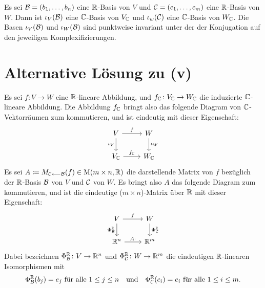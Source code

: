 \documentclass[a4paper,10pt,numbers=noenddot]{scrartcl}
\begin{document}
Es sei $\mathcal{B} = (b_1, \dotsc, b_n)$ eine $\mathbb{R}$-Basis von $V$ und $\mathcal{C} = (c_1, \dotsc, c_m)$ eine $\mathbb{R}$-Basis von $W$.
Dann ist $\iota_V(\mathcal{B})$ eine $\mathbb{C}$-Basis von $V_{\mathbb{C}}$ und $\iota_w(\mathcal{C})$ eine $\mathbb{C}$-Basis von $W_{\mathbb{C}}$.
Die Basen $\iota_V(\mathcal{B})$ und $\iota_W(\mathcal{B})$ sind punktweise invariant unter der der Konjugation auf den jeweiligen Komplexifizierungen.











\section{Alternative Lösung zu (v)}

Es sei $f \colon V \to W$ eine $\mathbb{R}$-lineare Abbildung, und $f_{\mathbb{C}} \colon V_{\mathbb{C}} \to W_{\mathbb{C}}$ die induzierte $\mathbb{C}$-lineare Abbildung.
Die Abbildung $f_{\mathbb{C}}$ bringt also das folgende Diagram von $\mathbb{C}$-Vektorräumen zum kommutieren, und ist eindeutig mit dieser Eigenschaft:
\[
  \begin{tikzcd}
      V       \arrow[r, "f"]      \arrow[d, "\iota_V"']
    & W                           \arrow[d, "\iota_W"]
    \\
      V_\Cbb  \arrow[r, "f_\Cbb"]
    & W_\Cbb
  \end{tikzcd}
\]
Es sei $A \coloneqq M_{\mathcal{C} \longleftarrow \mathcal{B}}(f) \in \operatorname{M}(m \times n, \mathbb{R})$ die darstellende Matrix von $f$ bezüglich der $\mathbb{R}$-Basis $\mathcal{B}$ von $V$ und $\mathcal{C}$ von $W$.
Es bringt also $A$ das folgende Diagram zum kommutieren, und ist die eindeutige ($m \times n$)-Matrix über $\mathbb{R}$ mit dieser Eigenschaft:
\[
  \begin{tikzcd}
      V      \arrow[r, "f"]       \arrow[d, "\Phi^\Rbb_\mc{B}"']
    & W                           \arrow[d, "\Phi^\Rbb_\mc{C}"]
    \\
      \Rbb^n \arrow[r, "A \cdot"]
    & \Rbb^m
  \end{tikzcd}
\]
Dabei bezeichnen $\Phi^{\mathbb{R}}_{\mathcal{B}} \colon V \to \mathbb{R}^n$ und $\Phi^{\mathbb{R}}_{\mathcal{C}} \colon W \to \mathbb{R}^m$ die eindeutigen $\mathbb{R}$-linearen Isomorphismen mit
\[
  \text{$\Phi^{\mathbb{R}}_{\mathcal{B}}(b_j) = e_j$ für alle $1 \leq j \leq n$}
  \quad\text{und}\quad
  \text{$\Phi^{\mathbb{R}}_{\mathcal{C}}(c_i) = e_i$ für alle $1 \leq i \leq m$}.
\]
\end{document}
